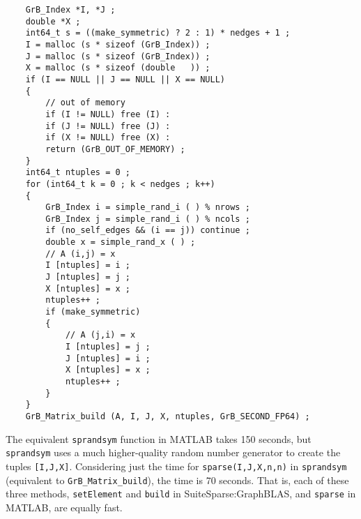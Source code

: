 \documentclass[12pt]{article}
\begin{document}
\newpage
    {\footnotesize
    \begin{verbatim}
    GrB_Index *I, *J ;
    double *X ;
    int64_t s = ((make_symmetric) ? 2 : 1) * nedges + 1 ;
    I = malloc (s * sizeof (GrB_Index)) ;
    J = malloc (s * sizeof (GrB_Index)) ;
    X = malloc (s * sizeof (double   )) ;
    if (I == NULL || J == NULL || X == NULL)
    {
        // out of memory
        if (I != NULL) free (I) :
        if (J != NULL) free (J) :
        if (X != NULL) free (X) :
        return (GrB_OUT_OF_MEMORY) ;
    }
    int64_t ntuples = 0 ;
    for (int64_t k = 0 ; k < nedges ; k++)
    {
        GrB_Index i = simple_rand_i ( ) % nrows ;
        GrB_Index j = simple_rand_i ( ) % ncols ;
        if (no_self_edges && (i == j)) continue ;
        double x = simple_rand_x ( ) ;
        // A (i,j) = x
        I [ntuples] = i ;
        J [ntuples] = j ;
        X [ntuples] = x ;
        ntuples++ ;
        if (make_symmetric)
        {
            // A (j,i) = x
            I [ntuples] = j ;
            J [ntuples] = i ;
            X [ntuples] = x ;
            ntuples++ ;
        }
    }
    GrB_Matrix_build (A, I, J, X, ntuples, GrB_SECOND_FP64) ; \end{verbatim}}

The equivalent \verb'sprandsym' function in MATLAB takes 150 seconds, but
\verb'sprandsym' uses a much higher-quality random number generator to create
the tuples \verb'[I,J,X]'.  Considering just the time for
\verb'sparse(I,J,X,n,n)' in \verb'sprandsym' (equivalent to
\verb'GrB_Matrix_build'), the time is 70 seconds.  That is, each of these three
methods, \verb'setElement' and \verb'build' in SuiteSparse:GraphBLAS, and
\verb'sparse' in MATLAB, are equally fast.


% 

\end{document}

